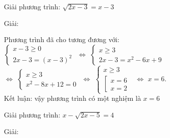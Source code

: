           \begin{vd}
            Giải phương trình: $ \sqrt{2x-3} = x-3 $

          \end{vd}
          \begin{center}

            Giải:
         \end{center}
          Phương trình đã cho tương đương với: \\
         $
            \begin{cases}
                x - 3 \geq 0 \\
                2x- 3 = (x-3)^2
            \end{cases}
          $ 
        $    \Leftrightarrow $
          $
            \begin{cases}
                x \geq 3 \\
                2x - 3 = x^2 -6x +9
            \end{cases}
          $ \\
        $    \Leftrightarrow $
         $
            \begin{cases}
                x  \geq 3 \\
                x^2 - 8x + 12 =0
            \end{cases}
          $ 
        $    \Leftrightarrow $
         $
            \begin{cases}
                x  \geq 3 \\
                \left[ \begin{array} {l}
                    x=6 \\ 
                    x=2
                  \end{array}
                \right.
                
            \end{cases}
          $ 
        $    \Leftrightarrow $
        $
            x=6.
        $
 \\        
         Kết luận: vậy phương trình có một nghiệm là $x=6$
      
          \begin{vd}
            Giải phương trình: $ x - \sqrt{2x -5} =4 $

          \end{vd}
          \begin{center}

            Giải:
         \end{center}
         
